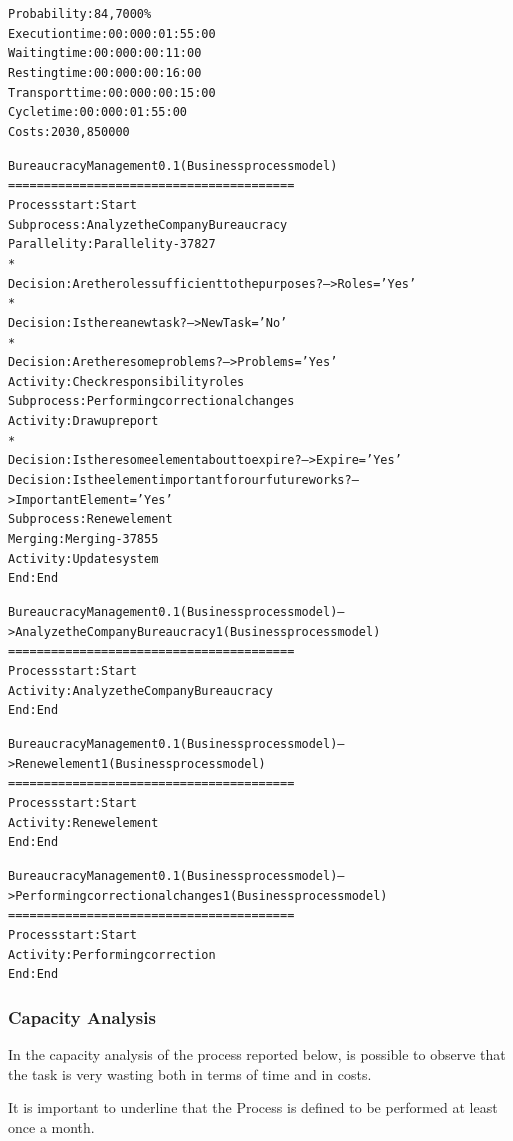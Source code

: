 \begin{alltt}
Probability:   84,7000\%
Execution time:  00:000:01:55:00
Waiting time:  00:000:00:11:00
Resting time:  00:000:00:16:00
Transport time:  00:000:00:15:00
Cycle time:  00:000:01:55:00
Costs:  2030,850000

Bureaucracy Management 0.1 (Business process model)
========================================
Process start: Start
Subprocess: Analyze the Company Bureaucracy
Parallelity: Parallelity-37827
    *
    Decision: Are the roles sufficient to the purposes? --> Roles='Yes'
    *
    Decision: Is there a new task? --> NewTask='No'
    *
    Decision: Are there some problems? --> Problems='Yes'
    Activity: Check responsibility roles
    Subprocess: Performing correctional changes
    Activity: Draw up report
    *
    Decision: Is there some element about to expire? --> Expire='Yes'
    Decision: Is the element important for our future works? --> ImportantElement='Yes'
    Subprocess: Renew element
Merging: Merging-37855
Activity: Update system
End: End

Bureaucracy Management 0.1 (Business process model) --> Analyze the Company Bureaucracy 1 (Business process model)
========================================
Process start: Start
Activity: Analyze the Company Bureaucracy
End: End

Bureaucracy Management 0.1 (Business process model) --> Renew element 1 (Business process model)
========================================
Process start: Start
Activity: Renew element
End: End

Bureaucracy Management 0.1 (Business process model) --> Performing correctional changes 1 (Business process model)
========================================
Process start: Start
Activity: Performing correction
End: End
\end{alltt}


\subsubsection{Capacity Analysis}
In the capacity analysis of the process reported below, is possible to observe that the task is very wasting both in terms of time and in costs.

It is important to underline that the Process is defined to be performed at least once a month.

